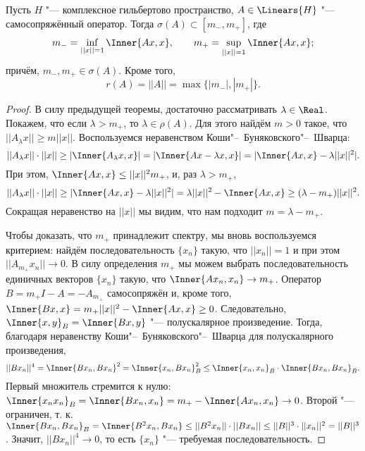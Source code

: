 \documentclass[main]{subfiles}
\begin{document}
\begin{theorem}%
  Пусть \( H \) "--- комплексное гильбертово пространство,
  \( A \in \Linears{H} \) "--- самосопряжённый оператор.
  Тогда \( \sigma(A) \subset [m_{-}, m_{+}] \),
  где
  \[
    m_{-} = \inf_{||x||=1} \Inner{Ax, x}, \qquad
    m_{+} = \sup_{||x||=1} \Inner{Ax, x};
  \]
  причём, \( m_{-}, m_{+} \in \sigma(A) \).
  Кроме того,
  \[
    r(A) = ||A|| = \max \{ |m_{-}|, |m_{+}| \}.
  \]
\end{theorem}
\begin{proof}
  В силу предыдущей теоремы, достаточно
  рассматривать \( \lambda \in \Real \).
  Покажем, что если \( \lambda > m_+ \),
  то \( \lambda \in \rho(A) \).
  Для этого найдём \( m > 0 \) такое,
  что \( ||A_\lambda x|| \ge m ||x|| \).
  Воспользуемся неравенством Коши"--~Буняковского"--~Шварца:
  \[
    ||A_\lambda x|| \cdot ||x|| \ge
    |\Inner{A_\lambda x, x}| = 
    |\Inner{A x - \lambda x, x}| = 
    |\Inner{A x, x} - \lambda ||x||^2|.
  \]
  При этом, \( \Inner{A x, x} \le ||x||^2 m_+ \),
  и, раз \( \lambda > m_+ \),
  \[
    ||A_\lambda x|| \cdot ||x|| \ge
    |\Inner{Ax, x} - \lambda ||x||^2| =
    \lambda ||x||^2 - \Inner{Ax, x} \ge
    (\lambda - m_+) ||x||^2.
  \]
  Сокращая неравенство на \( ||x|| \)
  мы видим, что нам подходит
  \( m = \lambda - m_+ \).

  Чтобы доказать, что \( m_+ \) принадлежит
  спектру, мы вновь воспользуемся критерием:
  найдём последовательность \( \{ x_n \} \)
  такую, что \( ||x_n|| = 1 \) и
  при этом \( ||A_{m_+} x_n|| \to 0 \).
  В силу определения \( m_+ \) мы можем выбрать
  последовательность единичных векторов \( \{ x_n \} \)
  такую, что \( \Inner{A x_n, x_n} \to m_+ \).
  Оператор \( B = m_+ I - A = - A_{m_+} \)
  самосопряжён и, кроме того,
  \( \Inner{Bx, x} = m_+ ||x||^2 - \Inner{A x, x} \ge 0 \).
  Следовательно, \( \Inner{x, y}_B = \Inner{Bx, y} \) "---
  полускалярное произведение.
  Тогда, благодаря неравенству Коши"--~Буняковского"--~Шварца для
  полускалярного произведения,
  \[
    ||B x_n||^4 = \Inner{B x_n, B x_n}^2 =
    \Inner{x_n, B x_n}_B^2 \le
    \Inner{x_n, x_n}_B \cdot \Inner{B x_n, B x_n}_B.
  \]
  Первый множитель стремится к нулю:
  \( \Inner{x_n x_n}_B = \Inner{B x_n, x_n} = 
  m_+ - \Inner{A x_n, x_n} \to 0 \).
  Второй "--- ограничен, т. к.
  \( \Inner{B x_n, B x_n}_B =
  \Inner{B^2 x_n, B x_n} \le
  ||B^2 x_n|| \cdot ||B x_n|| \le
  ||B||^3 \cdot ||x_n||^2 = ||B||^3 \).
  Значит, \( ||B x_n||^4 \to 0 \),
  то есть \( \{ x_n \} \) "--- требуемая последовательность.


\end{proof}
\end{document}
